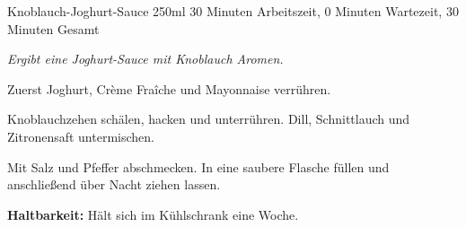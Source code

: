 \begin{recipe}{Knoblauch-Joghurt-Sauce} {250ml} {30 Minuten Arbeitszeit, 0 Minuten Wartezeit, 30 Minuten Gesamt}

  \freeform{}\textit{Ergibt eine Joghurt-Sauce mit Knoblauch Aromen.}


  Zuerst Joghurt, Crème Fraîche und Mayonnaise verrühren.


  Knoblauchzehen schälen, hacken und unterrühren.
  Dill, Schnittlauch und Zitronensaft untermischen.


  Mit Salz und Pfeffer abschmecken.
  In eine saubere Flasche füllen und anschließend über Nacht ziehen lassen.

  \freeform{}\hrulefill{}

  \freeform{}\textbf{Haltbarkeit:}
  Hält sich im Kühlschrank eine Woche.

\end{recipe}
